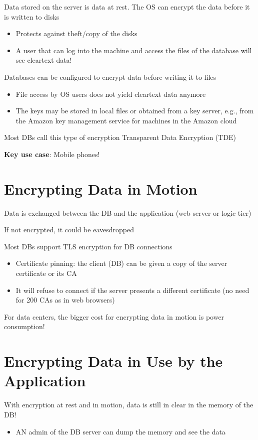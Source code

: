 \documentclass[11pt]{article}
\begin{document}
Data stored on the server is data at rest. The OS can encrypt the data before it is written to disks
\begin{itemize}
	\item Protects against theft/copy of the disks
	\item A user that can log into the machine and access the files of the database will see cleartext data!
\end{itemize}

Databases can be configured to encrypt data before writing it to files
\begin{itemize}
	\item File access by OS users does not yield cleartext data anymore
	\item The keys may be stored in local files or obtained from a key server, e.g., from the Amazon key management service for machines in the Amazon cloud
\end{itemize}

Most DBs call this type of encryption Transparent Data Encryption (TDE)

\textbf{Key use case}: Mobile phones!

\section*{Encrypting Data in Motion}

Data is exchanged between the DB and the application (web server or logic tier)

If not encrypted, it could be eavesdropped

Most DBs support TLS encryption for DB connections
\begin{itemize}
	\item Certificate pinning: the client (DB) can be given a copy of the server certificate or its CA
	\item It will refuse to connect if the server presents a different certificate (no need for 200 CAs as in web browsers)

\end{itemize}

For data centers, the bigger cost for encrypting data in motion is power consumption! 

\section*{Encrypting Data in Use by the Application}

With encryption at rest and in motion, data is still in clear in the memory of the DB!
\begin{itemize}
	\item AN admin of the DB server can dump the memory and see the data
\end{itemize}
\end{document}
